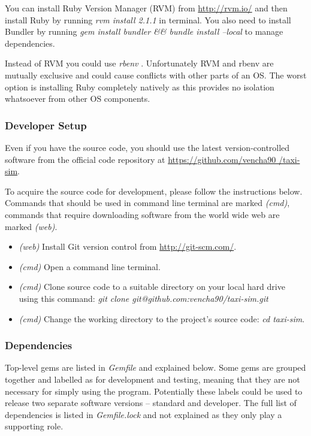You can install Ruby Version Manager (RVM) \parencite{Rvm} from
\url{http://rvm.io/} and then install Ruby by running \textit{rvm install
2.1.1} in terminal. You also need to install Bundler by
running \textit{gem install bundler \&\& bundle install --local} to manage
dependencies.

Instead of RVM you could use \textit{rbenv} \parencite{Rbenv}. Unfortunately
RVM and rbenv are mutually exclusive and could cause conflicts with other parts
of an OS. The worst option is installing Ruby completely natively as this
provides no isolation whatsoever from other OS components.


\subsubsection{Developer Setup}

Even if you have the source code, you should use the latest version-controlled
software from the official code repository at \url{https://github.com/vencha90
/taxi-sim}.

To acquire the source code for development, please follow the instructions
below. Commands that should be used in command line terminal are marked
\textit{(cmd)}, commands that require downloading software from the world wide
web are marked \textit{(web)}.

\begin{itemize}
  \item \textit{(web)} Install Git \parencite{Git} version control from
        \url{http://git-scm.com/}.
  \item \textit{(cmd)} Open a command line terminal.
  \item \textit{(cmd)} Clone source code to a suitable directory on your local
        hard drive using this command:
        \textit{git clone git@github.com:vencha90/taxi-sim.git}
  \item \textit{(cmd)} Change the working directory to the project's source
        code: \textit{cd taxi-sim}.
\end{itemize}


\subsubsection{Dependencies}

Top-level gems are listed in \textit{Gemfile} and explained below. Some gems
are grouped together and labelled as for development and testing, meaning that
they are not necessary for simply using the program. Potentially these labels
could be used to release two separate software versions -- standard and
developer. The full list of dependencies is listed in \textit{Gemfile.lock} and
not explained as they only play a supporting role.

